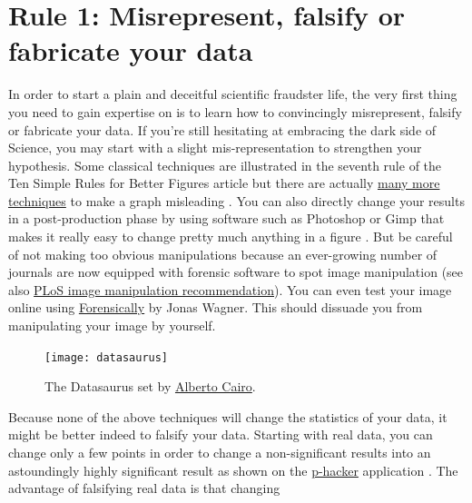 \documentclass[a4paper,10pt,onecolumn]{article}
\begin{document}
\section*{Rule 1: Misrepresent, falsify or fabricate your data}

In order to start a plain and deceitful scientific fraudster life, the very
first thing you need to gain expertise on is to learn how to convincingly
misrepresent, falsify or fabricate your data. If you're still hesitating at
embracing the dark side of Science, you may start with a slight
mis-representation to strengthen your hypothesis. Some classical
techniques are illustrated in the seventh rule of the Ten Simple Rules for
Better Figures \citep{rougier:2014} article but there are actually
\href{https://en.wikipedia.org/wiki/Misleading_graph}{many more techniques} to
make a graph misleading \citep{wainer:1984,raschke:2008}. You can also directly
change your results in a post-production phase by using software such as
Photoshop or Gimp that makes it really easy to change pretty much anything in a
figure \citep{cromey:2012, hendricks:2011}. But be careful of not making too
obvious manipulations because an ever-growing number of journals are now
equipped with forensic software to spot image manipulation \citep{white:2007,
  rossner:2004,hsu:2015} (see also
\href{http://journals.plos.org/ploscompbiol/s/figures#loc-image-manipulation}{PLoS
  image manipulation recommendation}). You can even test your image online
using \href{https://29a.ch/photo-forensics/#forensic-magnifier}{Forensically}
by Jonas Wagner. This should dissuade you from manipulating your image by
yourself.\\
%
\begin{figure}
  \begin{center}
    \texttt{[image: datasaurus]}
  \end{center}
  \caption{The Datasaurus set by \href{http://www.thefunctionalart.com/2016/08/download-datasaurus-never-trust-summary.html}{Alberto Cairo}. }
  \label{fig:datasaurus}
\end{figure}
%
Because none of the above techniques will change the statistics of your data,
it might be better indeed to falsify your data. Starting with real data, you
can change only a few points in order to change a non-significant results into
an astoundingly highly significant result as shown on the
\href{http://shinyapps.org/apps/p-hacker/}{p-hacker} application
\citep{schonbrodt:2015}. The advantage of falsifying real data is that changing
\end{document}
